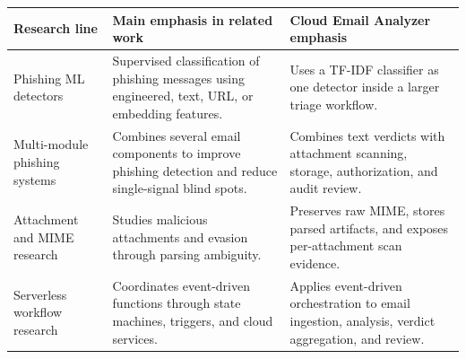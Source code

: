 \begin{table}[!htbp]
\centering
\footnotesize
\begin{tabular}{|>{\raggedright\arraybackslash}p{}|>{\raggedright\arraybackslash}p{}|>{\raggedright\arraybackslash}p{}|}
\hline
\textbf{Research line} & \textbf{Main emphasis in related work} & \textbf{Cloud Email Analyzer emphasis} \\
\hline
Phishing ML detectors & Supervised classification of phishing messages using engineered, text, URL, or embedding features. & Uses a TF-IDF classifier as one detector inside a larger triage workflow. \\
\hline
Multi-module phishing systems & Combines several email components to improve phishing detection and reduce single-signal blind spots. & Combines text verdicts with attachment scanning, storage, authorization, and audit review. \\
\hline
Attachment and MIME research & Studies malicious attachments and evasion through parsing ambiguity. & Preserves raw MIME, stores parsed artifacts, and exposes per-attachment scan evidence. \\
\hline
Serverless workflow research & Coordinates event-driven functions through state machines, triggers, and cloud services. & Applies event-driven orchestration to email ingestion, analysis, verdict aggregation, and review. \\
\hline
\end{tabular}
\end{table}
